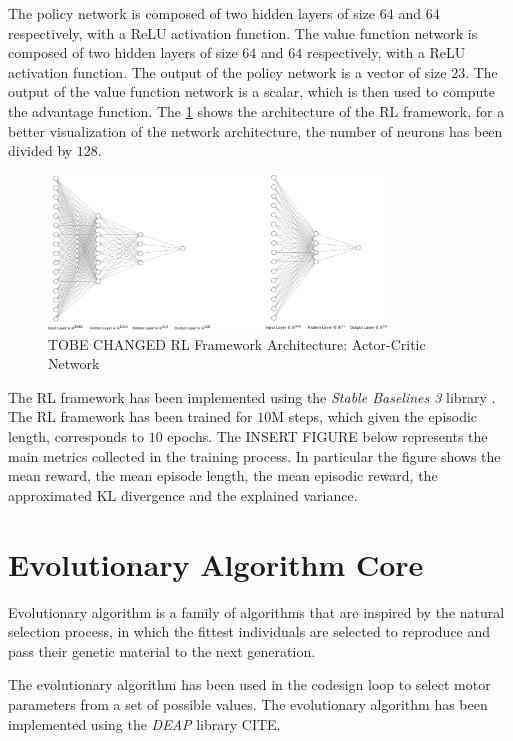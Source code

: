 The policy network is composed of two hidden layers of size $64$ and $64$ respectively, with a \ac{ReLU} activation function. The value function network is composed of two hidden layers of size $64$ and $64$ respectively, with a \ac{ReLU} activation function. The output of the policy network is a vector of size $23$. The output of the value function network is a scalar, which is then used to compute the advantage function. The \cref{fig:rlarchitecture} shows the architecture of the \ac{RL} framework, for a better visualization of the network architecture, the number of neurons has been divided by $128$.

\begin{figure}[h]
    \centering
    \includegraphics[width=0.8\textwidth]{Images/rl_architecture.png}
    \caption{TOBE CHANGED RL Framework Architecture: Actor-Critic Network}
    \label{fig:rlarchitecture}
\end{figure}

The \ac{RL} framework has been implemented using the \textit{Stable Baselines 3} library \cite{raffin_stable-baselines3_2021}. The \ac{RL} framework has been trained for $10$M steps, which given the episodic length, corresponds to $10$ epochs. The INSERT FIGURE below represents the main metrics collected in the training process. In particular the figure shows the mean reward, the mean episode length, the mean episodic reward, the approximated KL divergence and the explained variance.


\section{Evolutionary Algorithm Core}
\label{sec:EvolutionAlgo}

Evolutionary algorithm is a family of algorithms that are inspired by the natural selection
process, in which the fittest individuals are selected to reproduce and pass their genetic
material to the next generation.

The evolutionary algorithm has been used in the codesign loop to select motor parameters from a set of possible values. The evolutionary algorithm has been implemented using the \textit{DEAP} library CITE.

